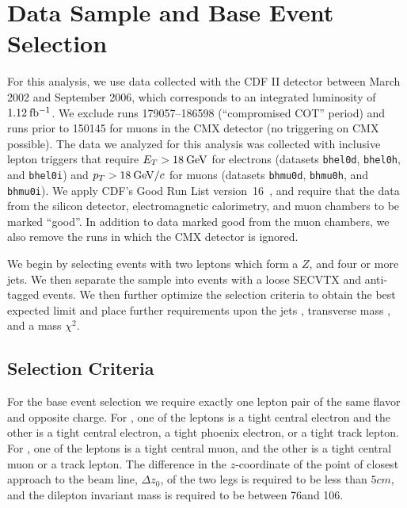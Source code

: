 \section{Data Sample and Base Event Selection}
For this analysis, we use data collected with the CDF II detector
between March 2002 and September 2006, which corresponds to an
integrated luminosity of $1.12\:\mathrm{fb^{-1}}$. We exclude runs 179057--186598
(``compromised COT'' period) and runs prior to 150145 for muons in the
CMX detector (no triggering on CMX possible).  The data we analyzed
for this analysis was collected with inclusive lepton triggers that
require $E_{T} > 18\:\mathrm{GeV}$ for electrons (datasets \texttt{bhel0d},
\texttt{bhel0h}, and \texttt{bhel0i}) and $p_{T} > 18\:\mathrm{GeV}/c$ for muons
(datasets \texttt{bhmu0d}, \texttt{bhmu0h}, and \texttt{bhmu0i}). We
apply CDF's Good Run List version~16~\cite{GoodRun16},
and require that the data from the silicon detector, electromagnetic
calorimetry, and muon chambers to be marked ``good''. In addition to
data marked good from the muon chambers, we also remove the runs in
which the CMX detector is ignored.

We begin by selecting events with two leptons which form a $Z$, and
four or more jets. We then separate the sample into events with a
loose SECVTX \btag and anti-tagged events. We then further optimize the
selection criteria to obtain the best expected limit and place further
requirements upon the jets \et, transverse mass \mt, and a mass
$\chi^2$.

\subsection{Selection Criteria}
For the base event selection we require exactly one lepton pair of the
same flavor and opposite charge. For \Zee, one of the leptons is a tight 
central electron and the other is a tight central electron, a tight phoenix
electron, or a tight track lepton.  For \Zmm, one of the leptons is a
tight central muon, and the other is a tight central muon or a track
lepton.  The difference in the $z$-coordinate of the point of closest
approach to the beam line, $\Delta z_0$, of the two legs is required to be
less than $5\unit{cm}$, and the dilepton invariant mass is required
to be between 76\gevcsq and 106\gevcsq.


